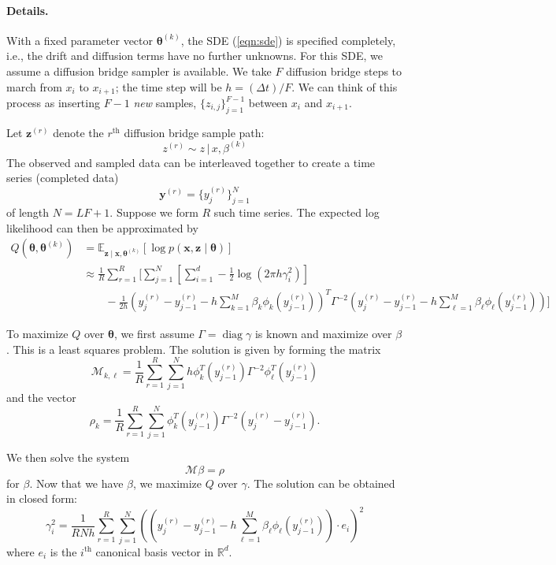 \documentclass{article}
\newcommand{\btheta}{\ensuremath{\bm{\theta}}}
\newcommand{\opdiag}{\ensuremath{\operatorname{diag}}}
\newcommand{\bx}{\ensuremath{\mathbf{x}}}
\newcommand{\bz}{\ensuremath{\mathbf{z}}}
\begin{document}
\paragraph{Details.} With a fixed parameter vector $\btheta^{(k)}$, the SDE (\ref{eqn:sde}) is specified completely, i.e., the drift and diffusion terms have no further unknowns.  For this SDE, we assume a diffusion bridge sampler is available.  We take $F$ diffusion bridge steps to march from $x_i$ to $x_{i+1}$; the time step will be $h = (\Delta t)/F$.  We can think of this process as inserting $F-1$ \emph{new} samples, $\{z_{i,j}\}_{j=1}^{F-1}$ between $x_i$ and $x_{i+1}$. 

Let $\mathbf{z}^{(r)}$ denote the $r^\text{th}$ diffusion bridge sample path:
\begin{equation}
z^{(r)} \sim z \, | \, x, \beta^{(k)}
\end{equation}
The observed and sampled data can be interleaved together to create a time series (completed data)
$$
\mathbf{y}^{(r)} = \{y_j^{(r)}\}_{j=1}^N
$$
of length $N = LF + 1$.  Suppose we form $R$ such time series.  The expected log likelihood can then be approximated by
\begin{align*}
Q(\btheta, \btheta^{(k)}) &= \mathbb{E}_{\bz \mid \bx, \btheta^{(k)}} [\log p(\bx, \bz \mid \btheta)] \\
 &\approx \frac{1}{R} \sum_{r=1}^R \biggl[ \sum_{j=1}^N \left[ \sum_{i=1}^d -\frac{1}{2} \log (2 \pi h \gamma_i^2) \right] \\
 &\qquad -\frac{1}{2h} (y_j^{(r)} - y_{j-1}^{(r)} - h \sum_{k=1}^M \beta_k \phi_k(y_{j-1}^{(r)}))^T \Gamma^{-2} (y_j^{(r)} - y_{j-1}^{(r)} - h \sum_{\ell=1}^M \beta_\ell \phi_\ell(y_{j-1}^{(r)}) ) \biggr] 
\end{align*}

To maximize $Q$ over $\btheta$, we first assume $\Gamma = \opdiag \gamma$ is known and maximize over $\beta$.  This is a least squares problem.  The solution is given by forming the matrix
$$
\mathcal{M}_{k,\ell} = \frac{1}{R} \sum_{r=1}^{R} \sum_{j=1}^N h \phi_k^T (y_{j-1}^{(r)}) \Gamma^{-2} \phi_\ell^T (y_{j-1}^{(r)})
$$
and the vector
$$
\rho_k = \frac{1}{R} \sum_{r=1}^{R} \sum_{j=1}^N \phi_k^T (y_{j-1}^{(r)}) \Gamma^{-2} (y_j^{(r)} - y_{j-1}^{(r)}).
$$

We then solve the system
$$
\mathcal{M} \beta = \rho
$$
for $\beta$.  Now that we have $\beta$, we maximize $Q$ over $\gamma$.  The solution can be obtained in closed form:
$$
\gamma_i^2 = \frac{1}{R N h} \sum_{r=1}^{R} \sum_{j=1}^N (( y_j^{(r)} - y_{j-1}^{(r)} - h \sum_{\ell=1}^M \beta_\ell \phi_\ell (y_{j-1}^{(r)}) ) \cdot e_i )^2
$$
where $e_i$ is the $i^\text{th}$ canonical basis vector in $\mathbb{R}^d$.
\end{document}
